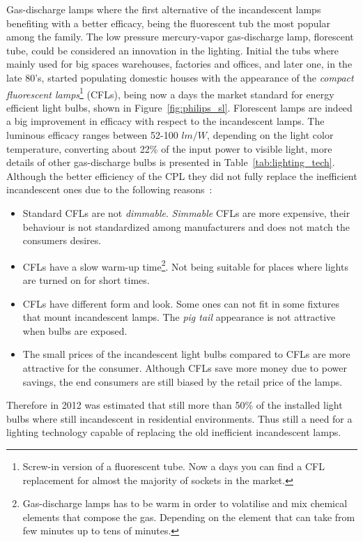 Gas-discharge lamps where the first alternative of the incandescent lamps benefiting with a better efficacy, being the fluorescent tub the most popular among the family. The low pressure mercury-vapor gas-discharge  lamp, florescent tube, could be considered an innovation in the lighting. Initial the tubs where mainly used for big spaces warehouses, factories and offices, and later one, in the late 80's, started populating domestic houses with the appearance of the \emph{compact fluorescent lamps}\footnote{Screw-in version of a fluorescent tube. Now a days you can find a CFL replacement for almost the majority of sockets in the market.} (CFLs), being now a days the market standard for energy efficient light bulbs, shown in Figure~\ref{fig:philips_sl}. Florescent lamps are indeed a big improvement in efficacy with respect to the incandescent lamps. The luminous efficacy ranges between 52-100 $lm/W$, depending on the light color temperature, converting about 22\% of the input power to visible light, more details of other gas-discharge bulbs is presented in Table~\ref{tab:lighting_tech}. Although the better efficiency of the CPL they did not fully replace the inefficient incandescent ones due to the following reasons~\cite{11EPA}:
\begin{itemize}
  \item Standard CFLs are not \emph{dimmable}.  \emph{Simmable} CFLs are more expensive, their behaviour is not standardized among manufacturers and does not match the consumers desires.
  \item CFLs have a slow warm-up time\footnote{Gas-discharge lamps has to be warm in order to volatilise and mix chemical elements that compose the gas. Depending on the element that can take from few minutes up to tens of minutes. }. Not being suitable for places where lights are turned on for short times.
  \item CFLs have different form and look. Some ones can not fit in some fixtures that mount incandescent lamps. The \emph{pig tail} appearance is not attractive when bulbs are exposed.
  \item The small prices of the incandescent light bulbs compared to CFLs are more attractive for the consumer. Although CFLs save more money due to power savings, the end consumers are still biased by the retail price of the lamps.
\end{itemize}
Therefore in 2012 was estimated that still more than 50\% of the installed light bulbs where still incandescent in residential environments. Thus still a need for a lighting technology capable of replacing the old inefficient incandescent lamps.

